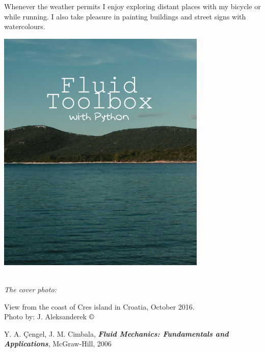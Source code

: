 \documentclass[10pt]{report}
\begin{document}
Whenever the weather permits I enjoy exploring distant places with my bicycle or while running. I also take pleasure in painting buildings and street signs with watercolours.

\begin{flushright}


\includegraphics[width = 100mm]{cover.png}

\setlength{\parskip}{0.1em}
\setlength{\parindent}{0cm}
\ \\[0.5cm]
\textit{The cover photo:}  

View from the coast of Cres island in Croatia, October 2016.
\ \\[0.1cm]
Photo by: J. Aleksanderek $\copyright$
\end{flushright}




\begin{thebibliography}{50}

\item Y. A. Çengel, J. M. Cimbala, \textbf{\textit{Fluid Mechanics: Fundamentals and Applications}}, McGraw-Hill, 2006
\item
\item
\item
\item
\item 

\item 
\item
\item
\item
\item
\item 

\item 
\item
\item
\item
\item
\item 
\thispagestyle{empty}
\end{thebibliography}
\end{document}
